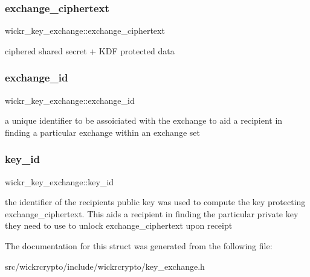 \subsubsection{\texorpdfstring{exchange\_ciphertext}{exchange\_ciphertext}}
{\footnotesize\ttfamily wickr\+\_\+key\+\_\+exchange\+::exchange\+\_\+ciphertext}

ciphered shared secret + K\+DF protected data \mbox{\label{structwickr__key__exchange_a744e71ef6676c78643646adf1693a4e5}} 
\subsubsection{\texorpdfstring{exchange\_id}{exchange\_id}}
{\footnotesize\ttfamily wickr\+\_\+key\+\_\+exchange\+::exchange\+\_\+id}

a unique identifier to be assoiciated with the exchange to aid a recipient in finding a particular exchange within an exchange set \mbox{\label{structwickr__key__exchange_abc0c1dbc866c150ffc275546b7e91e2d}} 
\subsubsection{\texorpdfstring{key\_id}{key\_id}}
{\footnotesize\ttfamily wickr\+\_\+key\+\_\+exchange\+::key\+\_\+id}

the identifier of the recipient\textquotesingle{}s public key was used to compute the key protecting \textquotesingle{}exchange\+\_\+ciphertext\textquotesingle{}. This aids a recipient in finding the particular private key they need to use to unlock \textquotesingle{}exchange\+\_\+ciphertext\textquotesingle{} upon receipt 

The documentation for this struct was generated from the following file\+:\begin{DoxyCompactItemize}
\item 
src/wickrcrypto/include/wickrcrypto/key\+\_\+exchange.\+h\end{DoxyCompactItemize}
